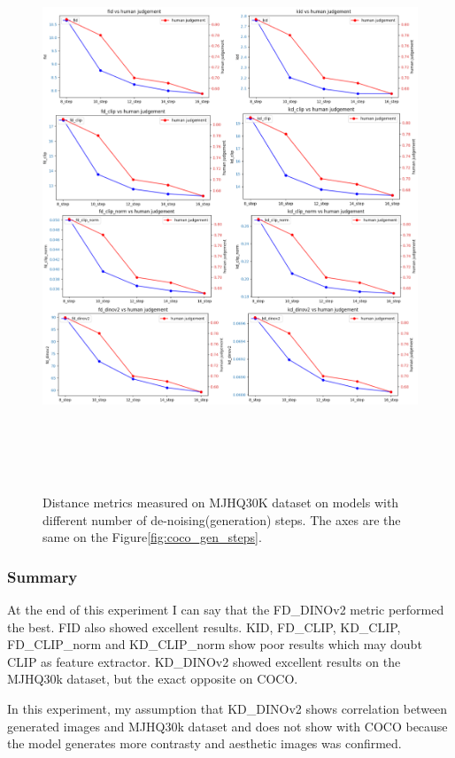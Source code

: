 \begin{figure}[]
\centering
\includegraphics[width=16cm, height=17cm]{figs/mjhq30k_gen_steps.png}
\caption{Distance metrics measured on MJHQ30K dataset on models with different number of de-noising(generation) steps. The axes are the same on the Figure\ref{fig:coco_gen_steps}.}
\label{fig:mjhq30k_gen_steps}
\end{figure}

\subsubsection{Summary}
At the end of this experiment I can say that the FD\_DINOv2 metric performed the best. FID also showed excellent results. KID, FD\_CLIP, KD\_CLIP, FD\_CLIP\_norm and KD\_CLIP\_norm show poor results which may doubt CLIP as feature extractor. KD\_DINOv2 showed excellent results on the MJHQ30k dataset, but the exact opposite on COCO.

In this experiment, my assumption that KD\_DINOv2 shows correlation between generated images and MJHQ30k dataset and does not show with COCO because the model generates more contrasty and aesthetic images was confirmed.

